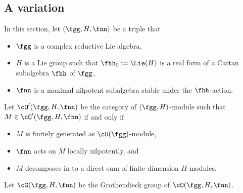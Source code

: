 \documentclass[12pt,a4paper]{amsart}
\numberwithin{equation}{section}
\theoremstyle{remark}
\DeclareMathOperator{\sspan}{span}
\def\Irr{\mathrm{Irr}}
\def\Coh{\mathrm{Coh}}
\def\leqL{\mathrel{\mathop{\leq}\limits_{\scriptscriptstyle L}}}
\def\leqR{\mathrel{\mathop{\leq}\limits_{\scriptscriptstyle R}}}
\def\approxLR{\mathrel{\mathop{\approx}\limits_{\scriptscriptstyle LR}}}
\begin{document}








%



\subsection{A variation}
In this section, let
$(\fgg, H,\fnn)$ be a triple that
\begin{itemize}
  \item $\fgg$ is a complex reductive Lie algebra,
  \item $H$ is a Lie group such that
        $\fhh_{0}:= \Lie(H)$ is a real form of
       a Cartan subalgebra  $\fhh$ of $\fgg$,
  \item $\fnn$ is a maximal nilpotent subalgebra
        stable under the $\fhh$-action.
\end{itemize}
Let $\cO'(\fgg, H,\fnn)$ be the category of $(\fgg, H)$-module such that
$M\in \cO'(\fgg,H,\fnn)$
if and only if
\begin{itemize}
  \item $M$ is finitely generated as $\cU(\fgg)$-module,
  \item $\fnn$ acts on $M$ locally nilpotently, and
  \item $M$ decomposes in to a direct sum of finite dimension $H$-modules.
\end{itemize}
Let $\Grt(\fgg,H,\fnn)$ be the Grothendieck group of $\cO(\fgg,H,\fnn)$.
\end{document}
